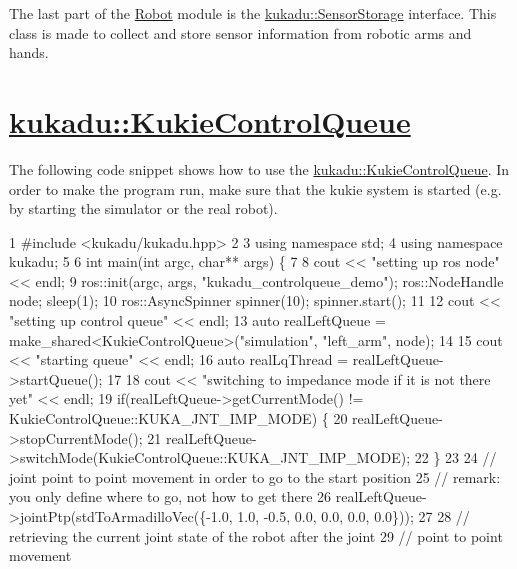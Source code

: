 The last part of the \hyperlink{group__Robot}{Robot} module is the \hyperlink{classkukadu_1_1SensorStorage}{kukadu\-::\-Sensor\-Storage} interface. This class is made to collect and store sensor information from robotic arms and hands.

\section*{\hyperlink{classkukadu_1_1KukieControlQueue}{kukadu\-::\-Kukie\-Control\-Queue}}

The following code snippet shows how to use the \hyperlink{classkukadu_1_1KukieControlQueue}{kukadu\-::\-Kukie\-Control\-Queue}. In order to make the program run, make sure that the kukie system is started (e.\-g. by starting the simulator or the real robot). 
\begin{DoxyCodeInclude}
1 \textcolor{preprocessor}{#include <kukadu/kukadu.hpp>}
2 
3 \textcolor{keyword}{using namespace }std;
4 \textcolor{keyword}{using namespace }kukadu;
5 
6 \textcolor{keywordtype}{int} main(\textcolor{keywordtype}{int} argc, \textcolor{keywordtype}{char}** args) \{
7 
8     cout << \textcolor{stringliteral}{"setting up ros node"} << endl;
9     ros::init(argc, args, \textcolor{stringliteral}{"kukadu\_controlqueue\_demo"}); ros::NodeHandle node; sleep(1);
10     ros::AsyncSpinner spinner(10); spinner.start();
11 
12     cout << \textcolor{stringliteral}{"setting up control queue"} << endl;
13     \textcolor{keyword}{auto} realLeftQueue = make\_shared<KukieControlQueue>(\textcolor{stringliteral}{"simulation"}, \textcolor{stringliteral}{"left\_arm"}, node);
14 
15     cout << \textcolor{stringliteral}{"starting queue"} << endl;
16     \textcolor{keyword}{auto} realLqThread = realLeftQueue->startQueue();
17 
18     cout << \textcolor{stringliteral}{"switching to impedance mode if it is not there yet"} << endl;
19     \textcolor{keywordflow}{if}(realLeftQueue->getCurrentMode() != KukieControlQueue::KUKA\_JNT\_IMP\_MODE) \{
20         realLeftQueue->stopCurrentMode();
21         realLeftQueue->switchMode(KukieControlQueue::KUKA\_JNT\_IMP\_MODE);
22     \}
23 
24     \textcolor{comment}{// joint point to point movement in order to go to the start position}
25     \textcolor{comment}{// remark: you only define where to go, not how to get there}
26     realLeftQueue->jointPtp(stdToArmadilloVec(\{-1.0, 1.0, -0.5, 0.0, 0.0, 0.0, 0.0\}));
27 
28     \textcolor{comment}{// retrieving the current joint state of the robot after the joint}
29     \textcolor{comment}{// point to point movement}

\end{DoxyCodeInclude}
